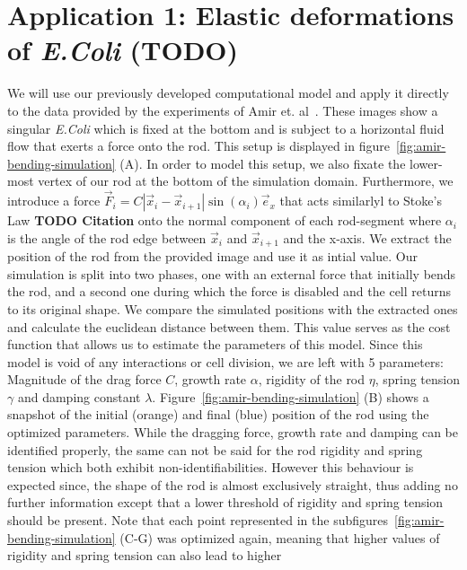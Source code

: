 \documentclass{article}
\begin{document}
\section{Application 1: Elastic deformations of \textit{E.Coli} (TODO)}
\label{section:application-1}

We will use our previously developed computational model and apply it directly to the data provided
by the experiments of Amir et. al~\cite{Amir2014,Amir2014_2}.
These images show a singular \textit{E.Coli} which is fixed at the bottom and is subject to a
horizontal fluid flow that exerts a force onto the rod.
This setup is displayed in figure~\ref{fig:amir-bending-simulation} (A).
In order to model this setup, we also fixate the lower-most vertex of our rod at the bottom of the
simulation domain.
Furthermore, we introduce a force $\vec{F}_i = C |\vec{x}_i - \vec{x}_{i+1}|\sin(\alpha_i)\vec{e}_x$
that acts similarlyl to Stoke's Law \textbf{TODO Citation} onto the normal component of each
rod-segment where $\alpha_i$ is the angle of the rod edge between $\vec{x}_i$ and $\vec{x}_{i+1}$
and the x-axis.
We extract the position of the rod from the provided image and use it as intial value.
Our simulation is split into two phases, one with an external force that initially bends the rod,
and a second one during which the force is disabled and the cell returns to its original shape.
We compare the simulated positions with the extracted ones and calculate the euclidean distance
between them.
This value serves as the cost function that allows us to estimate the parameters of this model.
Since this model is void of any interactions or cell division, we are left with 5 parameters:
Magnitude of the drag force $C$, growth rate $\alpha$, rigidity of the rod $\eta$, spring tension
$\gamma$ and damping constant $\lambda$.
Figure~\ref{fig:amir-bending-simulation} (B) shows a snapshot of the initial (orange) and final
(blue) position of the rod using the optimized parameters.
While the dragging force, growth rate and damping can be identified properly, the same
can not be said for the rod rigidity and spring tension which both exhibit non-identifiabilities.
However this behaviour is expected since, the shape of the rod is almost exclusively straight,
thus adding no further information except that a lower threshold of rigidity and spring tension
should be present.
Note that each point represented in the subfigures~\ref{fig:amir-bending-simulation} (C-G) was
optimized again, meaning that higher values of rigidity and spring tension can also lead to higher
\end{document}
